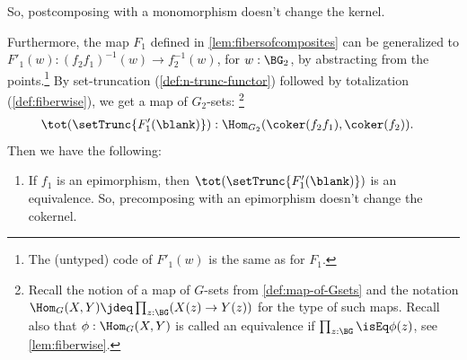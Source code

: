 \begin{corollary}
\begin{enumerate}
So, postcomposing with a monomorphism doesn't change the kernel.
\end{enumerate} 
Furthermore, the map $F_1$ defined in \cref{lem:fibersofcomposites}
can be generalized to 
$F'_1(w):(f_2f_1)^{-1}(w)\to f_2^{-1}(w)$, for $w:\BG_2$,
by abstracting from
the points.\footnote{%
The (untyped) code of $F'_1(w)$ is the same as for $F_1$.}
By set-truncation (\cref{def:n-trunc-functor}) followed by
totalization (\cref{def:fiberwise}), we get a map of $G_2$-sets:%
\footnote{
Recall the notion of a map of $G$-sets from \cref{def:map-of-Gsets} 
and the notation $\Hom_G(X,Y)\jdeq\prod_{z:\BG}(X(z)\to Y(z))$ for the 
type of such maps. Recall also that $\phi:\Hom_G(X,Y)$ is called an 
equivalence if $\prod_{z:\BG}\isEq\phi(z)$, see \cref{lem:fiberwise}.}
\begin{align*}
\tot(\setTrunc{F'_1(\blank)})&:\Hom_{G_2}(\coker(f_2f_1),\coker(f_2)).
\end{align*}
Then we have the following:
\begin{enumerate}[resume]
  \item\label{it:epif1->equivF'1} If $f_1$ is an epimorphism,
   then $\tot(\setTrunc{F'_1(\blank)})$ is an equivalence.
So, precomposing with an epimorphism doesn't change the cokernel.
  \end{enumerate}
\end{corollary}

